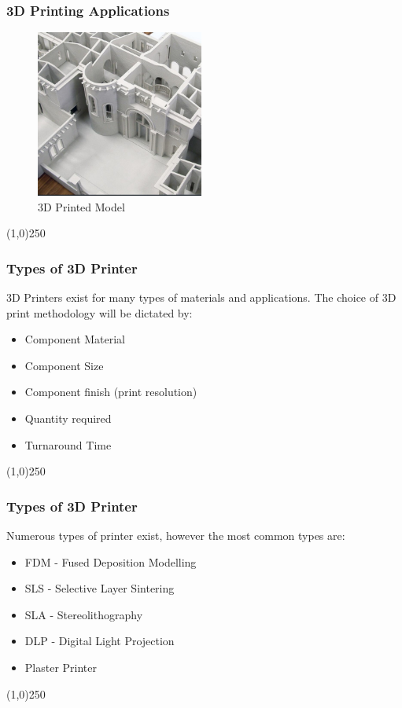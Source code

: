 \begin{frame}
\frametitle{3D Printing Applications}
\begin{figure}[h]
	\centering
	\includegraphics[height=5.5cm]{img/3DPrinting/3dprintModel.jpg}
	\caption[3D Printed Model]{3D Printed Model}
	\label{fig:3dprintModel}
\end{figure}
\end{frame}
\begin{center}\line(1,0){250}\end{center}




\begin{frame}
\frametitle{Types of 3D Printer}
3D Printers exist for many types of materials and applications.  The choice of 3D print methodology will be dictated by:
\begin{itemize}
	\item Component Material
	\item Component Size
	\item Component finish (print resolution)
	\item Quantity required
	\item Turnaround Time
\end{itemize}

\end{frame}
\begin{center}\line(1,0){250}\end{center}

\begin{frame}
\frametitle{Types of 3D Printer}
Numerous types of printer exist, however the most common types are:
\begin{itemize}
	\item FDM - Fused Deposition Modelling
	\item SLS - Selective Layer Sintering
	\item SLA - Stereolithography
	\item DLP - Digital Light Projection
	\item Plaster Printer
\end{itemize}
\end{frame}
\begin{center}\line(1,0){250}\end{center}

